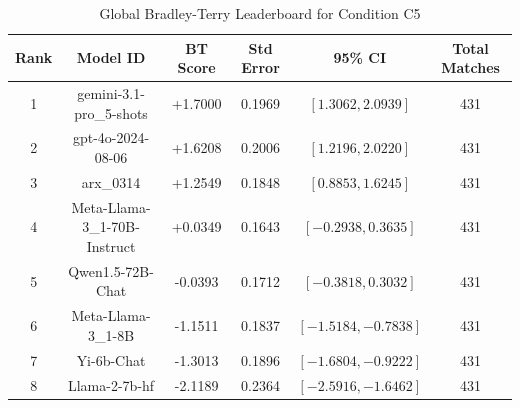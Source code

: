 \begin{table}[ht]
\centering
\caption{Global Bradley-Terry Leaderboard for Condition \textsc{C5}}
\label{tab:leaderboard_c5}
\begin{tabular}{cccccc}
\hline
\textbf{Rank} & \textbf{Model ID} & \textbf{BT Score} & \textbf{Std Error} & \textbf{95\% CI} & \textbf{Total Matches} \\
\hline
1 & gemini-3.1-pro\_5-shots & +1.7000 & 0.1969 & $[1.3062, 2.0939]$ & 431 \\
2 & gpt-4o-2024-08-06 & +1.6208 & 0.2006 & $[1.2196, 2.0220]$ & 431 \\
3 & arx\_0314 & +1.2549 & 0.1848 & $[0.8853, 1.6245]$ & 431 \\
4 & Meta-Llama-3\_1-70B-Instruct & +0.0349 & 0.1643 & $[-0.2938, 0.3635]$ & 431 \\
5 & Qwen1.5-72B-Chat & -0.0393 & 0.1712 & $[-0.3818, 0.3032]$ & 431 \\
6 & Meta-Llama-3\_1-8B & -1.1511 & 0.1837 & $[-1.5184, -0.7838]$ & 431 \\
7 & Yi-6b-Chat & -1.3013 & 0.1896 & $[-1.6804, -0.9222]$ & 431 \\
8 & Llama-2-7b-hf & -2.1189 & 0.2364 & $[-2.5916, -1.6462]$ & 431 \\
\hline
\end{tabular}
\end{table}
